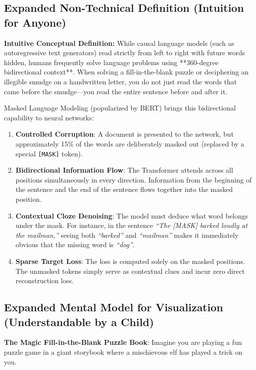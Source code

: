 \documentclass[11pt,a4paper]{article}
\theoremstyle{definition}
\begin{document}
\subsection{Expanded Non-Technical Definition (Intuition for Anyone)}
\textbf{Intuitive Conceptual Definition:}
While causal language models (such as autoregressive text generators) read strictly from left to right with future words hidden, humans frequently solve language problems using **360-degree bidirectional context**. When solving a fill-in-the-blank puzzle or deciphering an illegible smudge on a handwritten letter, you do not just read the words that came before the smudge—you read the entire sentence before and after it.

Masked Language Modeling (popularized by BERT) brings this bidirectional capability to neural networks:
\begin{enumerate}
    \item \textbf{Controlled Corruption}: A document is presented to the network, but approximately 15\% of the words are deliberately masked out (replaced by a special \texttt{[MASK]} token).
    \item \textbf{Bidirectional Information Flow}: The Transformer attends across all positions simultaneously in every direction. Information from the beginning of the sentence and the end of the sentence flows together into the masked position.
    \item \textbf{Contextual Cloze Denoising}: The model must deduce what word belongs under the mask. For instance, in the sentence \emph{``The [MASK] barked loudly at the mailman,''} seeing both \emph{``barked''} and \emph{``mailman''} makes it immediately obvious that the missing word is \emph{``dog''}.
    \item \textbf{Sparse Target Loss}: The loss is computed solely on the masked positions. The unmasked tokens simply serve as contextual clues and incur zero direct reconstruction loss.
\end{enumerate}

\subsection{Expanded Mental Model for Visualization (Understandable by a Child)}
\textbf{The Magic Fill-in-the-Blank Puzzle Book}:
Imagine you are playing a fun puzzle game in a giant storybook where a mischievous elf has played a trick on you.
\end{document}

